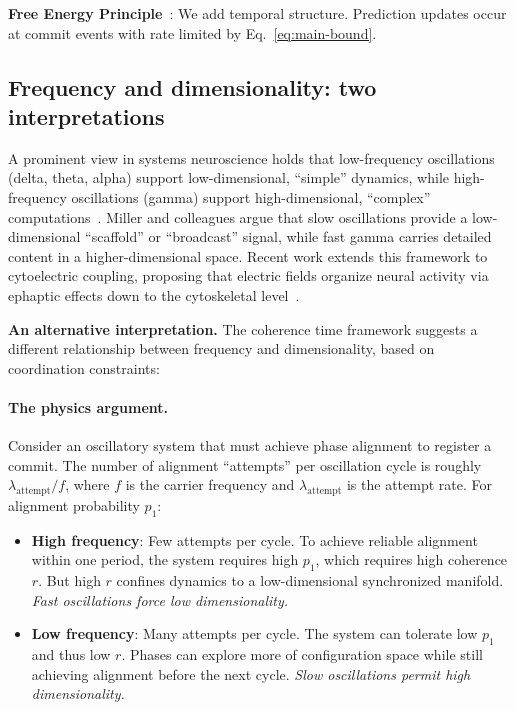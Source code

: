 \documentclass[12pt]{article}
\begin{document}
\textbf{Free Energy Principle}~\cite{friston2010}: We add temporal structure. Prediction updates occur at commit events with rate limited by Eq.~\ref{eq:main-bound}.

\subsection{Frequency and dimensionality: two interpretations}

A prominent view in systems neuroscience holds that low-frequency oscillations (delta, theta, alpha) support low-dimensional, ``simple'' dynamics, while high-frequency oscillations (gamma) support high-dimensional, ``complex'' computations~\cite{miller2018,lundqvist2016}. Miller and colleagues argue that slow oscillations provide a low-dimensional ``scaffold'' or ``broadcast'' signal, while fast gamma carries detailed content in a higher-dimensional space. Recent work extends this framework to cytoelectric coupling, proposing that electric fields organize neural activity via ephaptic effects down to the cytoskeletal level~\cite{pinotsis2023}.

\textbf{An alternative interpretation.} The coherence time framework suggests a different relationship between frequency and dimensionality, based on coordination constraints:

\paragraph{The physics argument.} Consider an oscillatory system that must achieve phase alignment to register a commit. The number of alignment ``attempts'' per oscillation cycle is roughly $\lambda_{\mathrm{attempt}} / f$, where $f$ is the carrier frequency and $\lambda_{\mathrm{attempt}}$ is the attempt rate. For alignment probability $p_1$:
\begin{itemize}
\item \textbf{High frequency}: Few attempts per cycle. To achieve reliable alignment within one period, the system requires high $p_1$, which requires high coherence $r$. But high $r$ confines dynamics to a low-dimensional synchronized manifold. \emph{Fast oscillations force low dimensionality.}
\item \textbf{Low frequency}: Many attempts per cycle. The system can tolerate low $p_1$ and thus low $r$. Phases can explore more of configuration space while still achieving alignment before the next cycle. \emph{Slow oscillations permit high dimensionality.}
\end{itemize}
\end{document}
